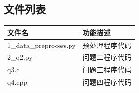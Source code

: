 \documentclass[withoutpreface,bwprint]{cumcmthesis}
\begin{document}
\newpage
\nocite{*}














\newpage
\begin{appendices}
	
	
	
	
\section{文件列表}
\begin{table}[H]
\centering
\begin{tabularx}{\textwidth}{LL}
\toprule
文件名   & 功能描述 \\
\midrule
1\_data\_preprocess.py & 预处理程序代码 \\
2\_q2.py & 问题二程序代码 \\
q3.c & 问题三程序代码 \\
q4.cpp & 问题四程序代码 \\
\bottomrule
\end{tabularx}
\label{tab:文件列表}
\end{table}








%
%
%
%
%
%
%
%
%

\end{appendices}
\end{document}
